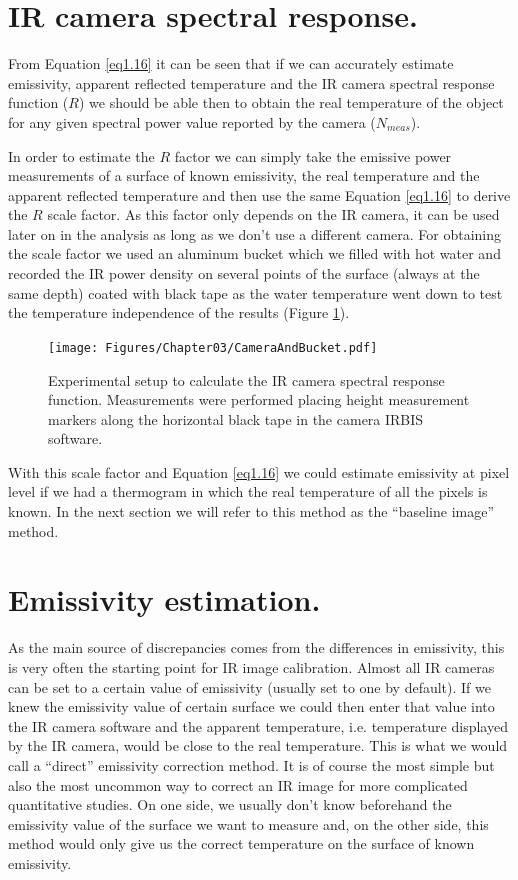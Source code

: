 	\section{IR camera spectral response.}\label{section3.2}
	
		From Equation \ref{eq1.16} it can be seen that if we can accurately estimate emissivity, apparent reflected temperature and the IR camera spectral response function ($R$) we should be able then to obtain the real temperature of the object for any given spectral power value reported by the camera ($N_{meas}$). 
		
		In order to estimate the $R$ factor we can simply take the emissive power measurements of a surface of known emissivity, the real temperature and the apparent reflected temperature and then use the same Equation \ref{eq1.16} to derive the $R$ scale factor. As this factor only depends on the IR camera, it can be used later on in the analysis as long as we don’t use a different camera.
		For obtaining the scale factor we used an aluminum bucket which we filled with hot water and recorded the IR power density on several points of the surface (always at the same depth) coated with black tape as the water temperature went down to test the temperature independence of the results (Figure \ref{fig3.1}).
		
		\begin{figure}[ht!]
			\centering
			\captionsetup{justification=centering,margin=2cm}
			\texttt{[image: Figures/Chapter03/CameraAndBucket.pdf]}
			\caption{Experimental setup to calculate the IR camera spectral response function. Measurements were performed placing height measurement markers along the horizontal black tape in the camera IRBIS software.}\label{fig3.1}
		\end{figure}
		
		With this scale factor and Equation \ref{eq1.16} we could estimate emissivity at pixel level if we had a thermogram in which the real temperature of all the pixels is known. In the next section we will refer to this method as the “baseline image” method.\bigskip
		
	\section{Emissivity estimation. }\label{section3.3}
		
		As the main source of discrepancies comes from the differences in emissivity, this is very often the starting point for IR image calibration. Almost all IR cameras can be set to a certain value of emissivity (usually set to one by default). If we knew the emissivity value of certain surface we could then enter that value into the IR camera software and the apparent temperature, i.e. temperature displayed by the IR camera, would be close to the real temperature. This is what we would call a “direct” emissivity correction method. It is of course the most simple but also the most uncommon way to correct an IR image for more complicated quantitative studies. On one side, we usually don’t know beforehand the emissivity value of the surface we want to measure and, on the other side, this method would only give us the correct temperature on the surface of known emissivity.
		
